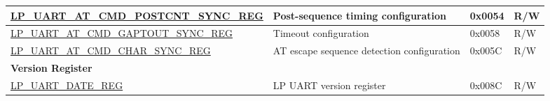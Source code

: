 \begin{longtable}{ | p{6.6cm} | p{6.5cm} | p{1.3cm} | p{1.6cm} | }
\hyperref[regdesc:LPUARTATCMDPOSTCNTSYNCREG]{LP\_UART\_AT\_CMD\_POSTCNT\_SYNC\_REG} & Post-sequence timing configuration & 0x0054 & R/W \\ \hline
\hyperref[regdesc:LPUARTATCMDGAPTOUTSYNCREG]{LP\_UART\_AT\_CMD\_GAPTOUT\_SYNC\_REG} & Timeout configuration & 0x0058 & R/W \\ \hline
\hyperref[regdesc:LPUARTATCMDCHARSYNCREG]{LP\_UART\_AT\_CMD\_CHAR\_SYNC\_REG} & AT escape sequence detection configuration & 0x005C & R/W \\ \hline
\multicolumn{4}{|l|}{\textbf{Version Register}} \\ \hline
\hyperref[regdesc:LPUARTDATEREG]{LP\_UART\_DATE\_REG} & LP UART version register & 0x008C & R/W \\ \hline

\end{longtable}
